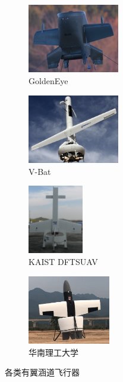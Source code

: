 \begin{figure}[ht]
    \centering
    \begin{subfigure}[b]{0.23\textwidth}
      \centering
      \includegraphics[height=3cm]{figure/chapter1/goldeneye.png}
      \caption{GoldenEye}
      \label{fig:image4}
    \end{subfigure}
    \hspace{6pt} %
    \begin{subfigure}[b]{0.23\textwidth}
      \centering
      \includegraphics[height=3cm]{figure/chapter1/V-bat.png}
      \caption{V-Bat}
      \label{fig:image5}
    \end{subfigure}
    \begin{subfigure}[b]{0.23\textwidth}
      \centering
      \includegraphics[height=3cm]{figure/chapter1/KAIST.png}
      \caption{KAIST DFTSUAV}
      \label{fig:image6}
    \end{subfigure}
    \begin{subfigure}[b]{0.23\textwidth}
      \centering
      \includegraphics[height=3cm]{figure/chapter1/china.png}
      \caption{华南理工大学}
      \label{fig:image7}
    \end{subfigure}
    \caption{各类有翼涵道飞行器}
    \label{fig:winguav}
\end{figure}
